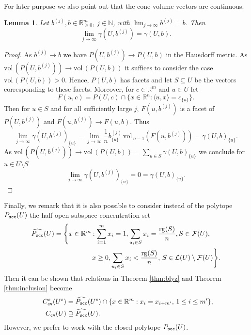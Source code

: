 \documentclass[11pt, a4paper, twoside, reqno]{amsart}
\DeclareMathOperator*{\rg}{rg}
\newcommand{\R}{\mathbb{R}}
\newcommand{\N}{\mathbb{N}}
\newtheorem{lemma}[theorem]{Lemma}
\theoremstyle{definition}
\theoremstyle{remark}
\newcommand{\vol}{\mathrm{vol}\,}
\newcommand{\scc}{{\tt scc}}
\newcommand{\cv}{{\tt cv}}
\numberwithin{equation}{section}
\begin{document}
For later purpose we also point out that the cone-volume vectors are
continuous.


\begin{lemma} Let $b^{(j)},b\in\R^m_{\geq 0}$, $j\in\N$,  with
  $\lim_{j\to\infty} b^{(j)} = b$. Then
  \begin{equation*}
    \lim_{j\to\infty} \gamma(U,b^{(j)})= \gamma(U,b).
  \end{equation*}
\label{lem:continuous}
\end{lemma}
\begin{proof} As $b^{(j)}\to b$  we have $P(U,b^{(j)})\to P(U,b)$ in
  the Hausdorff metric. As $\vol(P(U,b^{(j)}))\to \vol(P(U,b))$ it
  suffices to consider the case $\vol(P(U,b))>0$. Hence, $P(U,b)$ has facets and let $S\subseteq
  U$ be the vectors corresponding to these facets. Moreover, for
  $c\in\R^m$ and $u\in U$ let
  \begin{equation*}
     F(u,c)= P(U,c)\cap\{x\in\R^n : \langle u,x\rangle =c_{\{u\}}\}.
  \end{equation*}
  Then for $u\in S$  and 
 for all sufficiently large $j$, $F(u,b^{(j)})$ is a facet of
 $P(U,b^{(j)})$ and  $F(u,b^{(j)})\to F(u,b)$. Thus 
\begin{equation*}
            \lim_{j\to\infty}  \gamma(U, b^{(j)})_{\{u\}}=  \lim_{j\to\infty} \frac{1}{n} b^{(j)}_{\{u\}}\,\vol_{n-1}(F(u,b^{(j)}))=\gamma(U,b)_{\{u\}}.
\end{equation*}
As $\vol(P(U, b^{(j)})) \to\vol(P(U,b))=\sum_{u\in S} \gamma(U,b)_{\{u\}}$ we conclude for $u\in U\setminus S$
\begin{equation*}
            \lim_{j\to\infty}  \gamma(U, b^{(j)})_{\{u\}}= 0=\gamma(U,b)_{\{u\}}.
\end{equation*}
\end{proof}

Finally, we remark that it is also possible to consider instead of the
polytope $P_\scc(U)$ the half open subspace concentration set 
     \begin{equation*}
    \begin{split} 
    \widehat{P_\scc} (U)=  \Biggl\{ x \in \R^m & : \sum_{i = 1}^m x_i = 1, \sum_{u_i \in S }  x_i = \frac{\rg(S)}{n},  S \in \mathcal{F}(U), \\
     &\, x\geq 0, \sum_{u_i \in  S }  x_i < \frac{\rg(S)}{n},\,  S \in
     \mathcal{L}(U) \setminus \mathcal{F}(U) \Biggl\}.
   \end{split}
 \end{equation*}
Then it can be shown that relations in Theorem \ref{thm:blyz} and Theorem
\ref{thm:inclusion} become 
  \begin{align*}
     C^s_\cv(U^s) & =\widehat{P_\scc} (U^s) \cap 
                    \{ x \in \R^m : x_{i } = x_{i + m'},\,1\leq i\leq m' \}, %
    \\ \quad C_\cv(U)&\supseteq \widehat{P_\scc}(U).
   \end{align*}
However, we prefer to work with the closed polytope $P_\scc(U)$.
                                                                                                       
\end{document}
